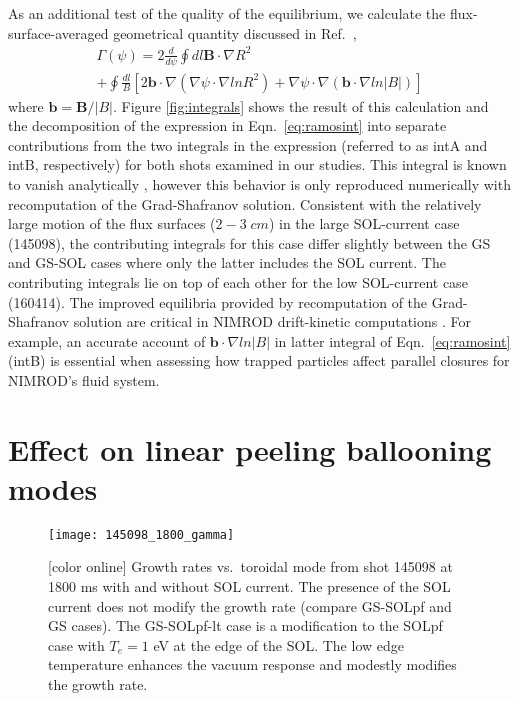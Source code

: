 \documentclass[english,aps,superscriptaddress,showkeys,showpacs,prepri,twocolumn]{revtex4}
\begin{document}
As an additional test of the quality of the equilibrium, we calculate the
flux-surface-averaged geometrical quantity discussed in Ref.~\cite{ramos15},
\begin{multline}
\Gamma (\psi)=2 \frac{d}{d\psi} \oint dl \mathbf{B}\cdot \nabla R^2 \\
+ \oint \frac{dl}{B} [2 \mathbf{b} \cdot \nabla (\nabla \psi \cdot \nabla ln R^2)
                     +\nabla \psi \cdot \nabla (\mathbf{b} \cdot \nabla ln |B|) ]
\label{eq:ramosint}
\end{multline}
where $\mathbf{b}=\mathbf{B}/|B|$. Figure \ref{fig:integrals} shows the result
of this calculation and the decomposition of the expression in
Eqn.~\eqref{eq:ramosint} into separate contributions from the two integrals in
the expression (referred to as intA and intB, respectively) for both shots examined
in our studies.  This integral is known to vanish analytically \cite{ramos15e},
however this behavior is only reproduced numerically with
recomputation of the Grad-Shafranov solution. Consistent with the relatively
large motion of the flux surfaces ($2-3\;cm$) in the large SOL-current case (145098), 
the contributing integrals for this case differ slightly between the GS and
GS-SOL cases where only the latter includes the SOL current. The contributing
integrals lie on top of each other for the low SOL-current case (160414).  The
improved equilibria provided by recomputation of the Grad-Shafranov solution
are critical in NIMROD drift-kinetic computations \cite{held15}.  For example,
an accurate account of $\mathbf{b} \cdot \nabla ln |B|$ in latter integral of
Eqn.~\eqref{eq:ramosint} (intB) is essential when assessing how trapped
particles affect parallel closures for NIMROD's fluid system.
\section{Effect on linear peeling ballooning modes}
\label{sec:pbm}

\begin{figure}
\begin{center}
\texttt{[image: 145098\_1800\_gamma]}
\caption{ [color online]
Growth rates vs.~toroidal mode from shot 145098 at 1800 ms with and without SOL
current. The presence of the SOL current does not modify the growth rate
(compare GS-SOLpf and GS cases). The GS-SOLpf-lt case is a modification to the
SOLpf case with $T_e=1$ eV at the edge of the SOL. The low edge temperature 
enhances the vacuum response \cite{Burke10,Ferraro10} and modestly modifies the
growth rate.
}
\label{gamma145098}
\end{center}
\end{figure}
\end{document}
